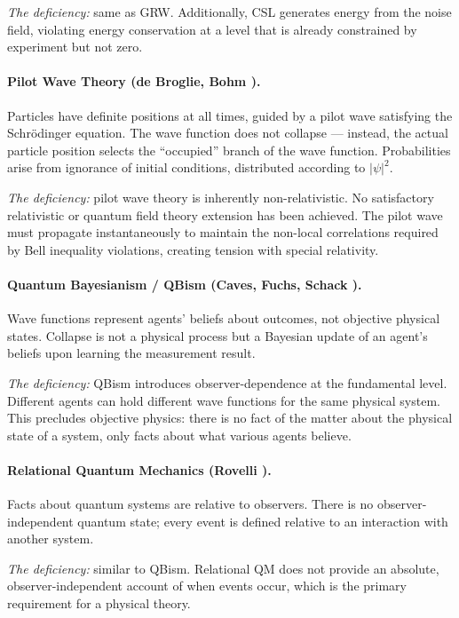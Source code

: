 \documentclass[12pt,a4paper]{article}
\begin{document}
\textit{The deficiency:} same as GRW.  Additionally, CSL generates energy from the noise field, violating energy conservation at a level that is already constrained by experiment but not zero.

\paragraph{Pilot Wave Theory (de Broglie, Bohm \cite{Bohm1952}).}
Particles have definite positions at all times, guided by a pilot wave satisfying the Schr\"odinger equation.  The wave function does not collapse --- instead, the actual particle position selects the ``occupied'' branch of the wave function.  Probabilities arise from ignorance of initial conditions, distributed according to $|\psi|^2$.

\textit{The deficiency:} pilot wave theory is inherently non-relativistic.  No satisfactory relativistic or quantum field theory extension has been achieved.  The pilot wave must propagate instantaneously to maintain the non-local correlations required by Bell inequality violations, creating tension with special relativity.

\paragraph{Quantum Bayesianism / QBism (Caves, Fuchs, Schack \cite{Fuchs2010}).}
Wave functions represent agents' beliefs about outcomes, not objective physical states.  Collapse is not a physical process but a Bayesian update of an agent's beliefs upon learning the measurement result.

\textit{The deficiency:} QBism introduces observer-dependence at the fundamental level.  Different agents can hold different wave functions for the same physical system.  This precludes objective physics: there is no fact of the matter about the physical state of a system, only facts about what various agents believe.

\paragraph{Relational Quantum Mechanics (Rovelli \cite{Rovelli1996}).}
Facts about quantum systems are relative to observers.  There is no observer-independent quantum state; every event is defined relative to an interaction with another system.

\textit{The deficiency:} similar to QBism.  Relational QM does not provide an absolute, observer-independent account of when events occur, which is the primary requirement for a physical theory.
\end{document}
